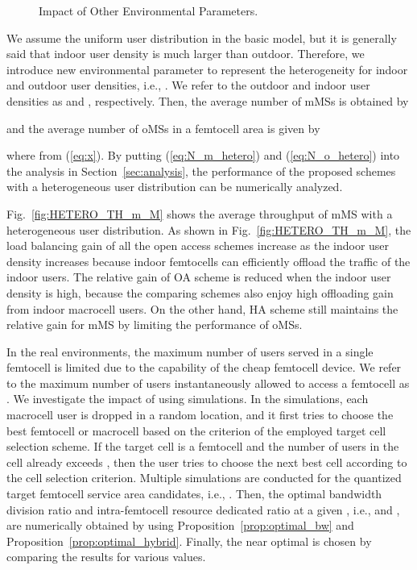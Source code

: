 \documentclass[journal]{IEEEtran}
\begin{document}
\begin{figure*}
\centering {}\hfill
{}\hfill
{}
\caption{Impact of Other Environmental Parameters.} \label{fig:other_parameters}
\end{figure*}
We assume the uniform user distribution in the basic model, but
it is generally said that indoor user density is
much larger than outdoor. Therefore, we introduce new
environmental parameter to represent the
heterogeneity for indoor and outdoor user densities, i.e.,  .
We refer to the outdoor and indoor user densities as  and
, respectively.
Then, the average number of mMSs is obtained by

and the average number of oMSs in a femtocell area is given by

where  from (\ref{eq:x}).
By putting (\ref{eq:N_m_hetero}) and (\ref{eq:N_o_hetero}) into
the analysis in Section~\ref{sec:analysis},
the performance of the proposed schemes
with a heterogeneous user distribution can  be numerically analyzed.

Fig.~\ref{fig:HETERO_TH_m_M} shows the average throughput of mMS
with a heterogeneous user distribution.
As shown in Fig.~\ref{fig:HETERO_TH_m_M}, the load balancing gain of all the
open access schemes increase as
the indoor user density increases because indoor femtocells
can efficiently offload the traffic of the indoor users.
The relative gain of OA scheme is reduced when the indoor user density is high,
because the comparing schemes also enjoy high offloading gain
from indoor macrocell users. On the other hand, HA scheme still
maintains the relative gain for mMS by limiting
the performance of oMSs.

In the real environments, the maximum number of users served
in a single femtocell is limited due to the capability
of the cheap femtocell device. We refer to
the maximum number of users instantaneously allowed
to access a femtocell as .
We investigate the
impact of  using  simulations.
In the simulations, each macrocell user is dropped in
a random location, and it first tries to choose the best femtocell or
macrocell based on the criterion of the employed target cell selection scheme.
If the target cell is a femtocell and the number of users in the cell
already exceeds , then the user tries to choose the next best cell
according to the cell selection criterion.
Multiple simulations are conducted for the quantized target femtocell service area candidates, i.e., . Then, the optimal bandwidth division ratio and intra-femtocell
resource dedicated ratio at a given , i.e.,  and , are numerically obtained by using Proposition~\ref{prop:optimal_bw} and Proposition~\ref{prop:optimal_hybrid}.
Finally, the near optimal  is chosen by comparing
the results for various  values.
\end{document}
